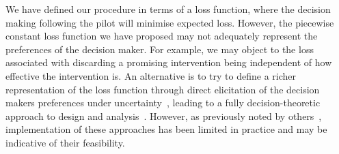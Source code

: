 \documentclass[AMA,STIX1COL]{WileyNJD-v2}
\begin{document}


We have defined our procedure in terms of a loss function, where the decision making following the pilot will minimise expected loss. However, the piecewise constant loss function we have proposed may not adequately represent the preferences of the decision maker. For example, we may object to the loss associated with discarding a promising intervention being independent of how effective the intervention is. An alternative is to try to define a richer representation of the loss function through direct elicitation of the decision makers preferences under uncertainty~\cite{French2000}, leading to a fully decision-theoretic approach to design and analysis~\cite{Lindley1997}. However, as previously noted by others~\cite{Joseph1997a, Bacchetti2008, Whitehead2008}, implementation of these approaches has been limited in practice and may be indicative of their feasibility.
\end{document}
